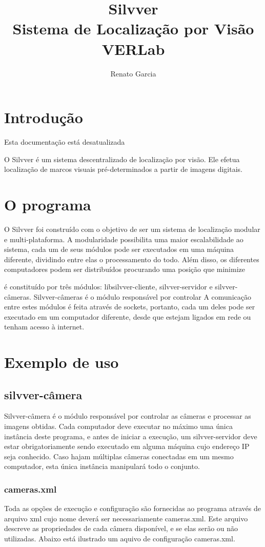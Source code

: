 \documentclass[a4paper,10pt]{article}
\title {Silvver \\ Sistema de Localização por Visão VERLab}
\author{Renato Garcia}
\date{}
\begin{document}
\maketitle

\section{Introdução}
Esta documentação está desatualizada

O Silvver é um sistema descentralizado de localização por visão. Ele
efetua localização de marcos visuais pré-determinados a partir de
imagens digitais.


\section{O programa}
O Silvver foi construído com o objetivo de ser um sistema de
localização modular e multi-plataforma. A modularidade possibilita uma
maior escalabilidade ao sistema, cada um de seus módulos pode ser
executados em uma máquina diferente, dividindo entre elas o
processamento do todo. Além disso, os diferentes computadores podem
ser distribuídos procurando uma posição que minimize

é constituído por três módulos: libsilvver-cliente, silvver-servidor e
silvver-câmeras. Silvver-câmeras é o módulo responsável por controlar
A comunicação entre estes módulos é feita através de sockets,
portanto, cada um deles pode ser executado em um computador diferente,
desde que estejam ligados em rede ou tenham acesso à internet.

\section{Exemplo de uso}
\subsection{silvver-câmera}
Silvver-câmera é o módulo responsável por controlar as câmeras e
processar as imagens obtidas. Cada computador deve executar no máximo
uma única instância deste programa, e antes de iniciar a execução, um
silvver-servidor deve estar obrigatoriamente sendo executado em alguma
máquina cujo endereço IP seja conhecido. Caso hajam múltiplas câmeras
conectadas em um mesmo computador, esta única instância manipulará
todo o conjunto.

\subsubsection{cameras.xml}
Toda as opções de execução e configuração são fornecidas ao programa
através de arquivo xml cujo nome deverá ser necessariamente
cameras.xml. Este arquivo descreve as propriedades de cada câmera
disponível, e se elas serão ou não utilizadas. Abaixo está ilustrado
um aquivo de configuração cameras.xml.
\end{document}
